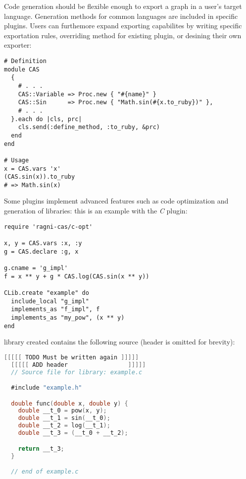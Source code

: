 Code generation should be flexible enough to export a graph in a user's target language. Generation methods for common languages are included in specific plugins. Users can furthemore expand exporting capabilites by writing specific exportation rules,  overriding method for existing plugin, or desining their own exporter:
\begin{lstlisting}[caption={Example of Ruby exportation plugin},label={code:example-exporting}]
# Definition
module CAS
  {
    # . . .
    CAS::Variable => Proc.new { "#{name}" }
    CAS::Sin      => Proc.new { "Math.sin(#{x.to_ruby})" },
    # . . .
  }.each do |cls, prc|
    cls.send(:define_method, :to_ruby, &prc)
  end
end

# Usage
x = CAS.vars 'x'
(CAS.sin(x)).to_ruby
# => Math.sin(x)
\end{lstlisting}

Some plugins implement advanced features such as code optimization and generation of libraries: this is an example with the \emph{C} plugin:

\begin{lstlisting}[caption={Calling optimized-C exporter for library generation},label={code:example-exporting-C-1}]
require 'ragni-cas/c-opt'

x, y = CAS.vars :x, :y
g = CAS.declare :g, x

g.cname = 'g_impl'
f = x ** y + g * CAS.log(CAS.sin(x ** y))

CLib.create "example" do
  include_local "g_impl"
  implements_as "f_impl", f
  implements_as "my_pow", (x ** y)
end
\end{lstlisting}
library created contains the following source (header is omitted for brevity):
\begin{lstlisting}[caption={Calling optimized-C exporter},label={code:example-exporting-C-2},language=C]
  [[[[[ TODO Must be written again ]]]]]
  [[[[[ ADD header                 ]]]]]
  // Source file for library: example.c

  #include "example.h"

  double func(double x, double y) {
    double __t_0 = pow(x, y);
    double __t_1 = sin(__t_0);
    double __t_2 = log(__t_1);
    double __t_3 = (__t_0 + __t_2);

    return __t_3;
  }

  // end of example.c
\end{lstlisting}
